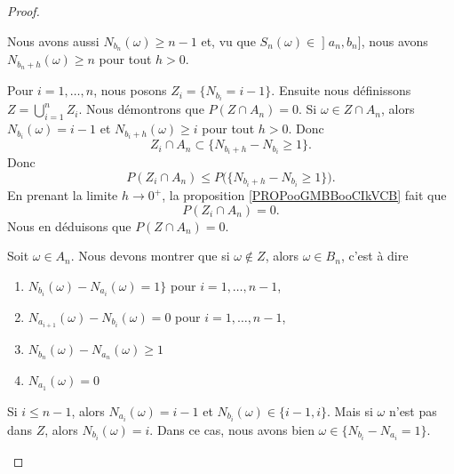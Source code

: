 \begin{proof}
\begin{subproof}
\begin{subproof}
Nous avons aussi \( N_{b_n}(\omega)\geq n-1\) et, vu que \( S_n(\omega)\in \mathopen] a_n , b_n \mathclose]\), nous avons \( N_{b_n+h}(\omega)\geq n\) pour tout \( h>0\).
        \end{subproof}
        Pour \( i=1,\ldots, n\), nous posons \( Z_i=\{ N_{b_i}=i-1 \}\). Ensuite nous définissons \( Z=\bigcup_{i=1}^nZ_i\). Nous démontrons que \( P(Z\cap A_n)=0\). Si \( \omega\in Z\cap A_n\), alors \( N_{b_i}(\omega)=i-1\) et \( N_{b_i+h}(\omega)\geq i\) pour tout \( h>0\). Donc
        \begin{equation}
            Z_i\cap A_n\subset\{ N_{b_i+h}-N_{b_i}\geq 1 \}.
        \end{equation}
        Donc
        \begin{equation}
            P(Z_i\cap A_n)\leq P\big( \{ N_{b_i+h}-N_{b_i}\geq 1 \} \big).
        \end{equation}
        En prenant la limite \( h\to 0^+\), la proposition \ref{PROPooGMBBooCIkVCB} fait que
        \begin{equation}
            P(Z_i\cap A_n)=0.
        \end{equation}
        Nous en déduisons que \( P(Z\cap A_n)=0\).

        Soit \( \omega\in A_n\). Nous devons montrer que si \( \omega\notin Z\), alors \( \omega\in B_n\), c'est à dire
        \begin{enumerate}
            \item
            $ N_{b_i}(\omega)-N_{a_i}(\omega)=1 \}$ pour \( i=1,\ldots, n-1\),
        \item
           $N_{a_{i+1}}(\omega)-N_{b_i}(\omega)=0$ pour \( i=1,\ldots, n-1\),
       \item
           
       $N_{b_n}(\omega)-N_{a_n}(\omega)\geq 1$
   \item
   $N_{a_1}(\omega)=0$
        \end{enumerate}

        Si \( i\leq n-1\), alors \( N_{a_i}(\omega)=i-1\) et \( N_{b_i}(\omega)\in \{ i-1,i \}\). Mais si \( \omega\) n'est pas dans \( Z\), alors \( N_{b_i}(\omega)=i\). Dans ce cas, nous avons bien \( \omega\in\{ N_{b_i}-N_{a_i}=1 \}\).


\end{subproof}
\end{proof}
